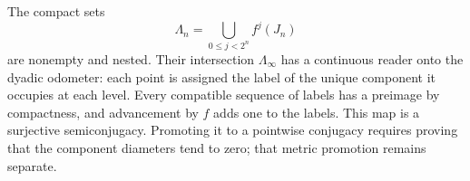 The compact sets
\[
\Lambda_n=\bigcup_{0\le j<2^n}f^j(J_n)
\]
are nonempty and nested. Their intersection \(\Lambda_\infty\) has a continuous reader onto the dyadic odometer: each point is assigned the label of the unique component it occupies at each level. Every compatible sequence of labels has a preimage by compactness, and advancement by \(f\) adds one to the labels. This map is a surjective semiconjugacy. Promoting it to a pointwise conjugacy requires proving that the component diameters tend to zero; that metric promotion remains separate.
